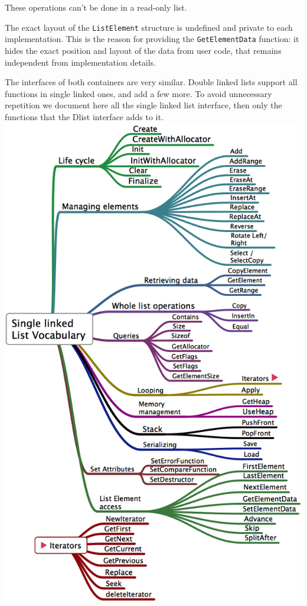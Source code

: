 \documentclass[12pt,a4paper]{memoir} %
\begin{document}
These operations can't be done in a read-only list.

The exact layout of the \verb,ListElement, structure is undefined and private to each implementation. This is the reason for providing the \verb,GetElementData, function: it hides the exact position and layout of the data from user code, that remains independent from implementation details.

The interfaces of both containers are very similar. Double linked lists support all functions in single linked ones, and add a few more. To avoid unnecessary repetition we document here all the single linked list interface, then only the functions that the Dlist interface adds to it.
\pagestyle{empty}
\newpage
\vspace*{-1.5in}
\includegraphics[scale=0.60]{ListVocabulary.png}
\newpage
\pagestyle{headings}
\end{document}
